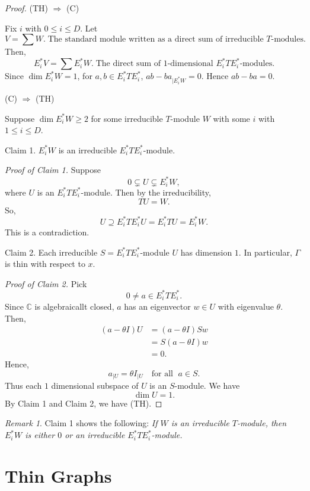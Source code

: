 \documentclass[
]{book}
\theoremstyle{definition}
\theoremstyle{definition}
\theoremstyle{definition}
\theoremstyle{definition}
\theoremstyle{remark}
\newtheorem*{remark}{Remark}
\begin{document}
\begin{proof}
\leavevmode

(TH) \(\Rightarrow\) (C)

Fix \(i\) with \(0\leq i\leq D\). Let
\[V = \sum W. \; \text{The standard module written as a direct sum of irreducible $T$-modules}.\]
Then,
\[E_i^*V = \sum E_i^*W. \; \text{The direct sum of 1-dimensional $E_i^*TE_i^*$-modules}.\]
Since \(\dim E_i^*W = 1\), for \(a, b\in E_i^*TE_i^*\), \({ab - ba}_{| E_i^*W} = 0\). Hence \(ab - ba = 0\).

(C) \(\Rightarrow\) (TH)

Suppose \(\dim E_i^*W \geq 2\) for some irreducible \(T\)-module \(W\) with some \(i\) with \(1\leq i\leq D\).

Claim 1. \(E_i^*W\) is an irreducible \(E_i^*TE_i^*\)-module.

\emph{Proof of Claim 1.}
Suppose
\[0 \subsetneq U \subsetneq E_i^*W,\]
where \(U\) is an \(E_i^*TE_i^*\)-module. Then by the irreducibility,
\[TU = W.\]
So,
\[U \supseteq E_i^*TE_i^*U = E_i^*TU = E^*_iW.\]
This is a contradiction.

Claim 2. Each irreducible \(S = E_i^*TE_i^*\)-module \(U\) has dimension \(1\). In particular, \(\Gamma\) is thin with respect to \(x\).

\emph{Proof of Claim 2.}
Pick
\[0\neq a \in E_i^*TE_i^*.\]
Since \(\mathbb{C}\) is algebraicallt closed, \(a\) has an eigenvector \(w\in U\) with eigenvalue \(\theta\). Then,
\begin{align}
(a- \theta I)U & = (a-\theta I)Sw\\
& = S(a-\theta I)w\\
& = 0.
\end{align}
Hence,
\[a_{|U} = \theta I_{|U} \quad \text{for all }\; a\in S.\]
Thus each \(1\) dimensional subspace of \(U\) is an \(S\)-module. We have
\[\dim U = 1.\]
By Claim 1 and Claim 2, we have (TH).

\end{proof}

\begin{remark}
Claim 1 shows the following: \emph{If \(W\) is an irreducible \(T\)-module, then \(E^*_iW\) is either \(0\) or an irreducible \(E^*_iTE^*_i\)-module.}
\end{remark}

\hypertarget{lec8}{%
\chapter{Thin Graphs}\label{lec8}}
\end{document}
